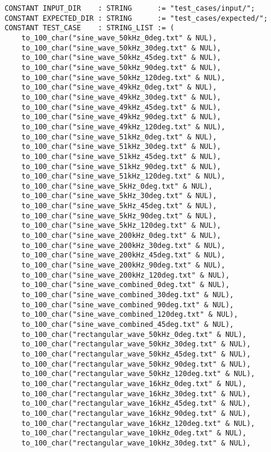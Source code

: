 \begin{lstlisting}
    CONSTANT INPUT_DIR    : STRING      := "test_cases/input/";
    CONSTANT EXPECTED_DIR : STRING      := "test_cases/expected/";
    CONSTANT TEST_CASE    : STRING_LIST := (
        to_100_char("sine_wave_50kHz_0deg.txt" & NUL),
        to_100_char("sine_wave_50kHz_30deg.txt" & NUL),
        to_100_char("sine_wave_50kHz_45deg.txt" & NUL),
        to_100_char("sine_wave_50kHz_90deg.txt" & NUL),
        to_100_char("sine_wave_50kHz_120deg.txt" & NUL),
        to_100_char("sine_wave_49kHz_0deg.txt" & NUL),
        to_100_char("sine_wave_49kHz_30deg.txt" & NUL),
        to_100_char("sine_wave_49kHz_45deg.txt" & NUL),
        to_100_char("sine_wave_49kHz_90deg.txt" & NUL),
        to_100_char("sine_wave_49kHz_120deg.txt" & NUL),
        to_100_char("sine_wave_51kHz_0deg.txt" & NUL),
        to_100_char("sine_wave_51kHz_30deg.txt" & NUL),
        to_100_char("sine_wave_51kHz_45deg.txt" & NUL),
        to_100_char("sine_wave_51kHz_90deg.txt" & NUL),
        to_100_char("sine_wave_51kHz_120deg.txt" & NUL),
        to_100_char("sine_wave_5kHz_0deg.txt" & NUL),
        to_100_char("sine_wave_5kHz_30deg.txt" & NUL),
        to_100_char("sine_wave_5kHz_45deg.txt" & NUL),
        to_100_char("sine_wave_5kHz_90deg.txt" & NUL),
        to_100_char("sine_wave_5kHz_120deg.txt" & NUL),
        to_100_char("sine_wave_200kHz_0deg.txt" & NUL),
        to_100_char("sine_wave_200kHz_30deg.txt" & NUL),
        to_100_char("sine_wave_200kHz_45deg.txt" & NUL),
        to_100_char("sine_wave_200kHz_90deg.txt" & NUL),
        to_100_char("sine_wave_200kHz_120deg.txt" & NUL),
        to_100_char("sine_wave_combined_0deg.txt" & NUL),
        to_100_char("sine_wave_combined_30deg.txt" & NUL),
        to_100_char("sine_wave_combined_90deg.txt" & NUL),
        to_100_char("sine_wave_combined_120deg.txt" & NUL),
        to_100_char("sine_wave_combined_45deg.txt" & NUL),
        to_100_char("rectangular_wave_50kHz_0deg.txt" & NUL),
        to_100_char("rectangular_wave_50kHz_30deg.txt" & NUL),
        to_100_char("rectangular_wave_50kHz_45deg.txt" & NUL),
        to_100_char("rectangular_wave_50kHz_90deg.txt" & NUL),
        to_100_char("rectangular_wave_50kHz_120deg.txt" & NUL),
        to_100_char("rectangular_wave_16kHz_0deg.txt" & NUL),
        to_100_char("rectangular_wave_16kHz_30deg.txt" & NUL),
        to_100_char("rectangular_wave_16kHz_45deg.txt" & NUL),
        to_100_char("rectangular_wave_16kHz_90deg.txt" & NUL),
        to_100_char("rectangular_wave_16kHz_120deg.txt" & NUL),
        to_100_char("rectangular_wave_10kHz_0deg.txt" & NUL),
        to_100_char("rectangular_wave_10kHz_30deg.txt" & NUL),

\end{lstlisting}
